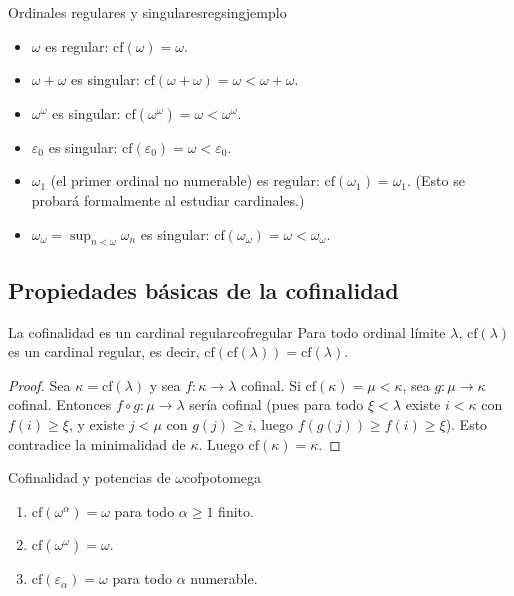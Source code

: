 \begin{ejemplo}{Ordinales regulares y singulares}{regsingjemplo}
\begin{itemize}[leftmargin=2em]
  \item $\omega$ es regular: $\mathrm{cf}(\omega) = \omega$.
  \item $\omega + \omega$ es singular: $\mathrm{cf}(\omega + \omega) = \omega < \omega + \omega$.
  \item $\omega^\omega$ es singular: $\mathrm{cf}(\omega^\omega) = \omega < \omega^\omega$.
  \item $\varepsilon_0$ es singular: $\mathrm{cf}(\varepsilon_0) = \omega < \varepsilon_0$.
  \item $\omega_1$ (el primer ordinal no numerable) es regular: $\mathrm{cf}(\omega_1) = \omega_1$. (Esto se probará formalmente al estudiar cardinales.)
  \item $\omega_\omega = \sup_{n < \omega} \omega_n$ es singular: $\mathrm{cf}(\omega_\omega) = \omega < \omega_\omega$.
\end{itemize}
\end{ejemplo}

\subsection{Propiedades básicas de la cofinalidad}

\begin{proposicion}{La cofinalidad es un cardinal regular}{cofregular}
Para todo ordinal límite $\lambda$, $\mathrm{cf}(\lambda)$ es un cardinal regular, es decir, $\mathrm{cf}(\mathrm{cf}(\lambda)) = \mathrm{cf}(\lambda)$.
\end{proposicion}

\begin{proof}
Sea $\kappa = \mathrm{cf}(\lambda)$ y sea $f: \kappa \to \lambda$ cofinal. Si $\mathrm{cf}(\kappa) = \mu < \kappa$, sea $g: \mu \to \kappa$ cofinal. Entonces $f \circ g: \mu \to \lambda$ sería cofinal (pues para todo $\xi < \lambda$ existe $i < \kappa$ con $f(i) \geq \xi$, y existe $j < \mu$ con $g(j) \geq i$, luego $f(g(j)) \geq f(i) \geq \xi$). Esto contradice la minimalidad de $\kappa$. Luego $\mathrm{cf}(\kappa) = \kappa$.
\end{proof}

\begin{proposicion}{Cofinalidad y potencias de $\omega$}{cofpotomega}
\begin{enumerate}[leftmargin=2em, label=(\roman*)]
  \item $\mathrm{cf}(\omega^\alpha) = \omega$ para todo $\alpha \geq 1$ finito.
  \item $\mathrm{cf}(\omega^\omega) = \omega$.
  \item $\mathrm{cf}(\varepsilon_\alpha) = \omega$ para todo $\alpha$ numerable.
\end{enumerate}
\end{proposicion}

